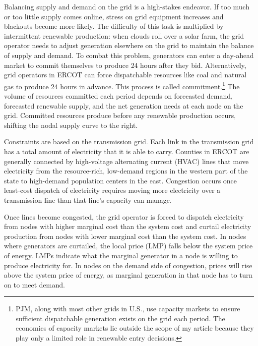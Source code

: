 \documentclass[12pt]{article}
\begin{document}
Balancing supply and demand on the grid is a high-stakes endeavor. If too much or too little supply comes online, stress on grid equipment increases and blackouts become more likely. The difficulty of this task is multiplied by intermittent renewable production: when clouds roll over a solar farm, the grid operator needs to adjust generation elsewhere on the grid to maintain the balance of supply and demand. To combat this problem, generators can enter a day-ahead market to commit themselves to produce 24 hours after they bid. Alternatively, grid operators in ERCOT can force dispatchable resources like coal and natural gas to produce 24 hours in advance. This process is called commitment.\footnote{PJM, along with most other grids in U.S., use capacity markets to ensure sufficient dispatchable generation exists on the grid each period. The economics of capacity markets lie outside the scope of my article because they play only a limited role in renewable entry decisions.} The volume of resources committed each period depends on forecasted demand, forecasted renewable supply, and the net generation needs at each node on the grid. Committed resources produce before any renewable production occurs, shifting the nodal supply curve to the right. 

Constraints are based on the transmission grid. Each link in the transmission grid has a total amount of electricity that it is able to carry. Counties in ERCOT are generally connected by high-voltage alternating current (HVAC) lines that move electricity from the resource-rich, low-demand regions in the western part of the state to high-demand population centers in the east. Congestion occurs once least-cost dispatch of electricity requires moving more electricity over a transmission line than that line's capacity can manage. 

Once lines become congested, the grid operator is forced to dispatch electricity from nodes with higher marginal cost than the system cost and curtail electricity production from nodes with lower marginal cost than the system cost. In nodes where generators are curtailed, the local price (LMP) falls below the system price of energy. LMPs indicate what the marginal generator in a node is willing to produce electricity for. In nodes on the demand side of congestion, prices will rise above the system price of energy, as marginal generation in that node has to turn on to meet demand. 
\end{document}
